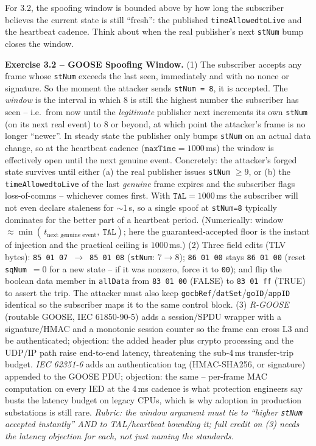 \documentclass[11pt,a4paper]{article}
\begin{document}
\begin{hintbox}
For 3.2, the spoofing window is bounded above by how long the subscriber
believes the current state is still ``fresh'': the published
\texttt{timeAllowedtoLive} and the heartbeat cadence. Think about when the
real publisher's next \texttt{stNum} bump closes the window.
\end{hintbox}

\begin{solutionbox}
\textbf{Exercise 3.2 -- GOOSE Spoofing Window.}
(1) The subscriber accepts any frame whose \texttt{stNum} exceeds the last
seen, immediately and with no nonce or signature. So the moment the attacker
sends \texttt{stNum = 8}, it is accepted. The \emph{window} is the interval
in which $8$ is still the highest number the subscriber has seen -- i.e.\
from now until the \emph{legitimate} publisher next increments its own
\texttt{stNum} (on its next real event) to $8$ or beyond, at which point the
attacker's frame is no longer ``newer''. In steady state the publisher only
bumps \texttt{stNum} on an actual data change, so at the heartbeat cadence
($\texttt{maxTime}=1000$\,ms) the window is effectively open until the next
genuine event. Concretely: the attacker's forged state survives until either
(a) the real publisher issues \texttt{stNum} $\ge 9$, or (b) the
\texttt{timeAllowedtoLive} of the last \emph{genuine} frame expires and the
subscriber flags loss-of-comms -- whichever comes first. With
$\texttt{TAL}=1000$\,ms the subscriber will not even declare staleness for
$\sim$1\,s, so a single spoof at \texttt{stNum=8} typically dominates for
the better part of a heartbeat period. (Numerically: window
$\approx \min(\,t_{\text{next genuine event}},\ \texttt{TAL})$; here the
guaranteed-accepted floor is the instant of injection and the practical
ceiling is $1000$\,ms.)
(2) Three field edits (TLV bytes):
\texttt{85 01 07}~$\to$~\texttt{85 01 08} (\texttt{stNum}: $7\to8$);
\texttt{86 01 00} stays \texttt{86 01 00} (reset \texttt{sqNum}~$=0$ for a
new state -- if it was nonzero, force it to \texttt{00}); and flip the
boolean data member in \texttt{allData} from \texttt{83 01 00} (FALSE) to
\texttt{83 01 ff} (TRUE) to assert the trip. The attacker must also keep
\texttt{gocbRef}/\texttt{datSet}/\texttt{goID}/\texttt{appID} identical so
the subscriber maps it to the same control block.
(3) \emph{R-GOOSE} (routable GOOSE, IEC 61850-90-5) adds a session/SPDU
wrapper with a signature/HMAC and a monotonic session counter so the frame
can cross L3 and be authenticated; objection: the added header plus crypto
processing and the UDP/IP path raise end-to-end latency, threatening the
sub-4\,ms transfer-trip budget. \emph{IEC 62351-6} adds an authentication
tag (HMAC-SHA256, or signature) appended to the GOOSE PDU; objection: the
same -- per-frame MAC computation on every IED at the 4\,ms cadence is what
protection engineers say busts the latency budget on legacy CPUs, which is
why adoption in production substations is still rare.
\textit{Rubric: the window argument must tie to ``higher \texttt{stNum}
accepted instantly'' AND to TAL/heartbeat bounding it; full credit on (3)
needs the latency objection for each, not just naming the standards.}
\end{solutionbox}
\end{document}
